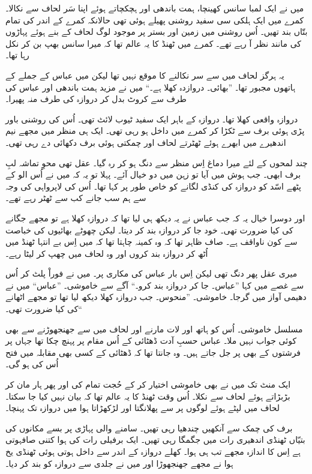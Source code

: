 \documentclass{article}
\begin{document}
میں نے ایک لمبا سانس کھینچا، ہمت باندھی اور ہچکچاتے ہوئے اپنا سَر لحاف سے نکالا۔ کمرے میں ایک ہلکی سی سفید روشنی پھیلے ہوئی تھی حالانکہ کمرے کے اندر کی تمام بتّاں بند تھیں۔ اُس روشنی میں زمین اور بستر پر موجود لوگ لحاف کے بنے ہوئے پہاڑوں کی مانند نظر آ رہے تھے۔ کمرے میں ٹھنڈ کا یہ عالم تھا کہ میرا سانس بھپ بن کر نکل رہا تھا۔

یہ ہرگز لحاف میں سے سر نکالنے کا موقع نہیں تھا لیکن میں عباس کے جملے کے ہاتھوں مجبور تھا۔ ''بھائی۔ دروازدہ کھلا ہے۔`` میں نے مزید ہمت باندھی اور عباس کی طرف سے کروٹ بدل کر دروازہ کی طرف منہ پھیرا۔

دروازہ واقعی کھلا تھا۔ دروازہ کے باہر ایک سفید ٹیوب لائٹ تھی۔ اُس کی روشنی باور پڑی ہوئی برف سے ٹکڑا کر کمرے میں داخل ہو رہی تھی۔ ایک ہی منظر میں مجھے نیم اندھیرے میں ابھرے ہوئے ٹھٹرتے لحاف اور چمکتی ہوئی برف دکھائی دے رہی تھی۔

چند لمحوں کے لئے میرا دماغ اِس منظر سے دنگ ہو کر رہ گیا۔ عقل تھی محوِ تماشہ لبِ برف ابھی۔ جب ہوش میں آیا تو زہن میں دو خیال آئے۔ پہلا تو یہ کہ میں نے اُس الو کے پٹھے اسّد کو دروازہ کی کنڈی لگانے کو خاص طور پر کہا تھا۔ اُس کی لاپرواہی کی وجہ سے ہم سب جانے کب سے ٹھٹر رہے تھے۔

اور دوسرا خیال یہ کہ جب عباس نے یہ دیکھ ہی لیا تھا کہ دروازہ کھلا ہے تو مجھے جگانے کی کیا ضرورت تھی۔ خود جا کر دروازہ بند کر دیتا۔ لیکن چھوٹے بھائیوں کی خباصت سے کون ناواقف ہے۔ صاف ظاہر تھا کہ وہ کمینہ چاہتا تھا کہ میں اِس بے انتہا ٹھنڈ میں اُٹھ کر دروازہ بند کروں اور وہ لحاف میں چھپ کر لیٹا رہے۔

میری عقل پھر دنگ تھی لیکن اِس بار عباس کی مکاری پر۔ میں نے فوراْ پلٹ کر اُس سے غصے میں کہا ''عباس۔ جا کر دروازہ بند کرو۔`` آگے سے خاموشی۔ ''عباس`` میں نے دھیمی آواز میں گرجا۔ خاموشی۔ ''منحوس۔ جب دروازہ کھلا دیکھ لیا تھا تو مجھے اٹھانے کی کیا ضرورت تھی۔``

مسلسل خاموشی۔ اُس کو ہاتھ اور لات مارنے اور لحاف میں سے جھنجھوڑنے سے بھی کوئی جواب نہیں ملا۔ عباس حسبِ آدت ڈھٹائی کے اُس مقام پر پہنچ چکا تھا جہاں پر فرشتوں کے بھی پر جل جاتے ہیں۔ وہ جانتا تھا کہ ڈھٹائی کے کسی بھی مقابلہ میں فتح اُس کی ہو گی۔

ایک منٹ تک میں نے بھی خاموشی اختیار کر کے حُجت تمام کی اور پھر ہار مان کر بڑبڑاتے ہوئے لحاف سے نکلا۔ اُس وقت ٹھنڈ کا یہ عالم تھا کہ بیان نہیں کیا جا سکتا۔ لحاف میں لپٹے ہوئے لوگوں پر سے پھلانگتا اور لڑکھڑاتا ہوا میں دروازہ تک پہنچا۔

برف کی چمک سے آنکھیں چندھیا رہی تھیں۔ سامنے والی پہاڑی پر بسے مکانوں کی بتیّاں ٹھنڈی اندھیری رات میں جگمگا رہی تھیں۔ ایک برفیلی رات کی ہوا کتنی صافہوتی ہے اِس کا اندازہ مجھے تب ہی ہوا۔ کھلے دروازہ کے اندر سے داخل ہوتی ہوئی ٹھنڈی یخ ہوا نے مجھے جھنجھوڑا اور میں نے جلدی سے دروازہ کو بند کر دیا۔
\end{document}
